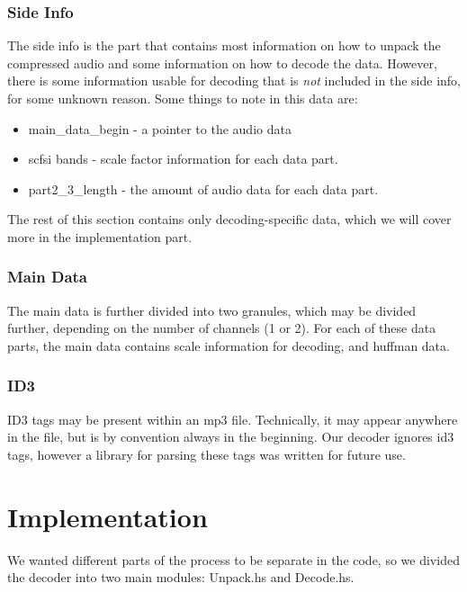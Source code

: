 \documentclass[a4paper,12pt]{article}
\begin{document}
       \subsubsection{Side Info}
            The side info is the part that contains most information on how to
            unpack the compressed audio and some information on how to decode
            the data. However, there is some information usable for decoding
            that is \textit{not} included in the side info, for some unknown
            reason. Some things to note in this data are:
            \begin{itemize}
                \item main\_data\_begin - a pointer to the audio data
                \item scfsi bands - scale factor information for each data part.
                \item part2\_3\_length - the amount of audio data for each
                      data part.
            \end{itemize}
            The rest of this section contains only decoding-specific data, which
            we will cover more in the implementation part.

       \subsubsection{Main Data}
            The main data is further divided into two granules, which may be
            divided further, depending on the number of channels (1 or 2). For
            each of these data parts, the main data contains scale information
            for decoding, and huffman data.

        \subsubsection{ID3}
            ID3 tags may be present within an mp3 file. Technically, it may
            appear anywhere in the file, but is by convention always in the
            beginning. Our decoder ignores id3 tags, however a library for
            parsing these tags was written for future use.

\section{Implementation}
    We wanted different parts of the process to be separate in the code, so we
    divided the decoder into two main modules: Unpack.hs and Decode.hs.
\end{document}
